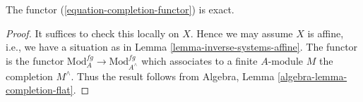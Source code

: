 \begin{lemma}
\label{lemma-exact}
The functor (\ref{equation-completion-functor}) is exact.
\end{lemma}

\begin{proof}
It suffices to check this locally on $X$. Hence we may assume $X$ is
affine, i.e., we have a situation as in
Lemma \ref{lemma-inverse-systems-affine}.
The functor is the functor $\text{Mod}^{fg}_A \to \text{Mod}^{fg}_{A^\wedge}$
which associates to a finite $A$-module $M$ the completion $M^\wedge$.
Thus the result follows from
Algebra, Lemma \ref{algebra-lemma-completion-flat}.
\end{proof}
